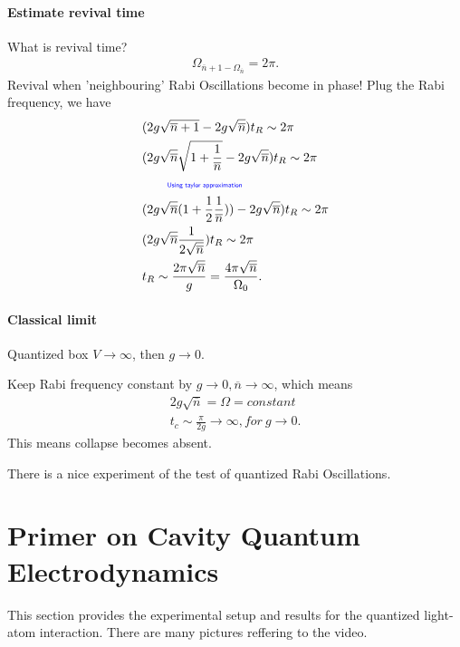 \documentclass[../../note.tex]{subfiles}
\begin{document}
\paragraph{Estimate revival time}
What is revival time? 
\begin{align}
    \Omega_{\overline{n}+1 - \Omega_{\overline{n}}} = 2 \pi.
\end{align}
Revival when 'neighbouring' Rabi Oscillations become in phase! Plug the Rabi frequency, we have
\begin{align}
    &(2 g \sqrt{\overline{n}+1} - 2 g \sqrt{\overline{n}}) t_R \sim 2 \pi \\
    &(2 g \sqrt{\overline{n}} \sqrt{1+\frac{1}{\overline{n}}} - 2 g \sqrt{\overline{n}}) t_R \sim 2 \pi  \\
    &\qquad\text{\color{blue}{\tiny\sffamily Using taylor approximation}} \\
    &(2 g \sqrt{\overline{n}} (1
    +\frac{1}{2}\frac{1}{\overline{n}})) - 2 g \sqrt{\overline{n}}) t_R \sim 2 \pi  \\
    &(2 g \sqrt{\overline{n}} \frac{1}{2 \sqrt{\overline{n}}}) t_R \sim 2 \pi \\
    &t_R \sim \frac{2 \pi \sqrt{\overline{n}}}{g} = \frac{4 \pi \sqrt{\overline{n}}}{\Omega_0}.
\end{align}

\paragraph*{Classical limit}
Quantized box $V \rightarrow \infty$, then $g \rightarrow 0$.

Keep Rabi frequency constant by $g \rightarrow 0, \overline{n} \rightarrow \infty$, which means 
\begin{align}
    2 g \sqrt{\overline{n}} = \Omega = constant \\
    t_c \sim \frac{\pi}{2 g} \rightarrow \infty, for~g \rightarrow 0.
\end{align}
This means collapse becomes absent.

There is a nice experiment of the test of quantized Rabi Oscillations.

\section{Primer on Cavity Quantum Electrodynamics}
This section provides the experimental setup and results for the quantized light-atom interaction. There are many pictures reffering to the video.
\end{document}
